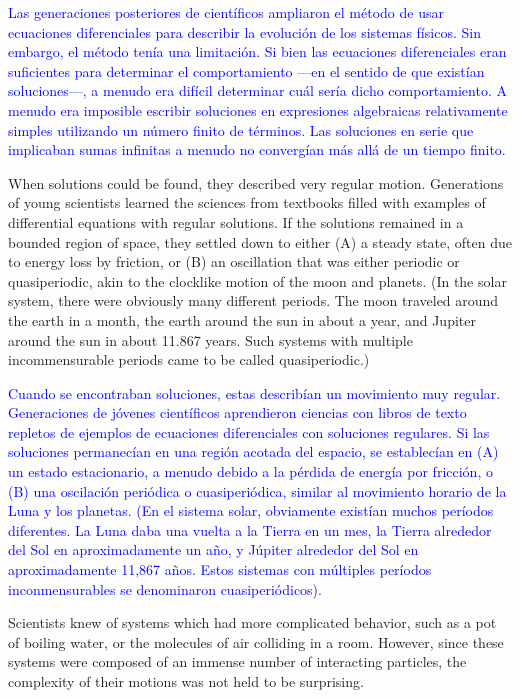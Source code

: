 \documentclass[12pt]{article}
\begin{document}
\textcolor{blue}{Las generaciones posteriores de científicos ampliaron el método de usar ecuaciones diferenciales para describir la evolución de los 
sistemas físicos. Sin embargo, el método tenía una limitación. Si bien las ecuaciones diferenciales eran suficientes para determinar el 
comportamiento —en el sentido de que existían soluciones—, a menudo era difícil determinar cuál sería dicho comportamiento. A menudo era imposible 
escribir soluciones en expresiones algebraicas relativamente simples utilizando un número finito de términos. Las soluciones en serie que implicaban 
sumas infinitas a menudo no convergían más allá de un tiempo finito.}

When solutions could be found, they described very regular motion. 
Generations of young scientists learned the sciences from textbooks filled with examples of differential equations with regular solutions. If the 
solutions remained in a bounded region of space, they settled down to either (A) a steady state, often due 
to energy loss by friction, or (B) an oscillation that was either periodic or quasiperiodic, akin to the 
clocklike motion of the moon and planets. (In the solar system, there were obviously many different 
periods. The moon traveled around the earth in a month, the earth around the sun in about a year, and 
Jupiter around the sun in about 11.867 years. Such systems with multiple incommensurable periods came to be 
called quasiperiodic.)

\textcolor{blue}{Cuando se encontraban soluciones, estas describían un movimiento muy regular. Generaciones de jóvenes científicos aprendieron 
ciencias con libros de texto repletos de ejemplos de ecuaciones diferenciales con soluciones regulares. Si las soluciones permanecían en una región 
acotada del espacio, se establecían en (A) un estado estacionario, a menudo debido a la pérdida de energía por fricción, o (B) una oscilación 
periódica o cuasiperiódica, similar al movimiento horario de la Luna y los planetas. (En el sistema solar, obviamente existían muchos períodos 
diferentes. La Luna daba una vuelta a la Tierra en un mes, la Tierra alrededor del Sol en aproximadamente un año, y Júpiter alrededor del Sol en 
aproximadamente 11,867 años. Estos sistemas con múltiples períodos inconmensurables se denominaron cuasiperiódicos).}

 Scientists knew of systems which 
had more complicated behavior, 
such as a pot of boiling water, or the molecules of air colliding in a room. However, since these systems were composed of an immense number of 
interacting particles, the complexity of their motions was not held to be surprising.
\end{document}
